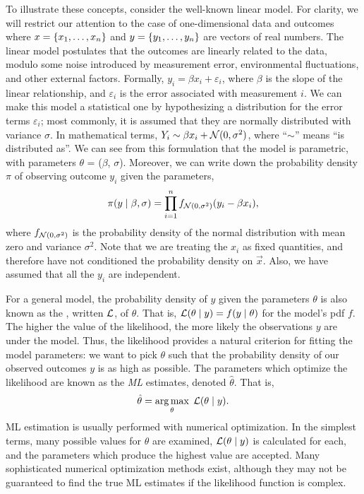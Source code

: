 To illustrate these concepts, consider the well-known linear model. For
clarity, we will restrict our attention to the case of one-dimensional data and
outcomes where $x = \left\lbrace x_1, \ldots, x_n\right\rbrace$ and $y = \left\lbrace y_1, \ldots, y_n\right\rbrace$
are vectors of real numbers. The linear model postulates that the outcomes are
linearly related to the data, modulo some noise introduced by measurement
error, environmental fluctuations, and other external factors. Formally, $y_i =
\beta x_i + \varepsilon_i$, where $\beta$ is the slope of the linear
relationship, and $\varepsilon_i$ is the error associated with measurement $i$.
We can make this model a statistical one by hypothesizing a distribution for
the error terms $\varepsilon_i$; most commonly, it is assumed that they are
normally distributed with variance $\sigma$. In mathematical terms, $Y_i \sim
\beta x_i + \mathcal{N}(0, \sigma^2)$, where ``$\sim$'' means ``is distributed as''. We
can see from this formulation that the model is parametric, with parameters
$\theta$ = ($\beta$, $\sigma$). Moreover, we can write down the probability
density $\pi$ of observing outcome $y_i$ given the parameters,
\[
  \pi(y \mid \beta, \sigma) = 
  \prod_{i=1}^n f_{\mathcal{N}(0, \sigma^2)} (y_i - \beta x_i),
\]
where $f_{\mathcal{N}(0, \sigma^2)}$ is the probability density of the normal
distribution with mean zero and variance $\sigma^2$. Note that we are treating
the $x_i$ as fixed quantities, and therefore have not conditioned the
probability density on $\vec{x}$. Also, we have assumed that all the $y_i$ are
independent.

For a general model, the probability density of $y$ given the parameters
$\theta$ is also known as the , written $\mathcal{L}$, of $\theta$.
That is, $\mathcal{L}(\theta \mid y) = f(y \mid \theta)$ for the model's \gls{pdf} $f$.
The higher the value of the likelihood, the more likely the observations $y$
are under the model. Thus, the likelihood provides a natural criterion for
fitting the model parameters: we want to pick $\theta$ such that the
probability density of our observed outcomes $y$ is as high as possible. The
parameters which optimize the likelihood are known as the \textit{\gls{ML}}
estimates, denoted $\hat{\theta}$. That is,
\[
  \hat{\theta} = \operatorname*{arg\,max}_\theta\; \mathcal{L}(\theta \mid y).
\]
\Gls{ML} estimation is usually performed with numerical optimization. In the
simplest terms, many possible values for $\theta$ are examined, $\mathcal{L}(\theta \mid
y)$ is calculated for each, and the parameters which produce the highest value
are accepted. Many sophisticated numerical optimization methods exist, although
they may not be guaranteed to find the true \gls{ML} estimates if the
likelihood function is complex. 

